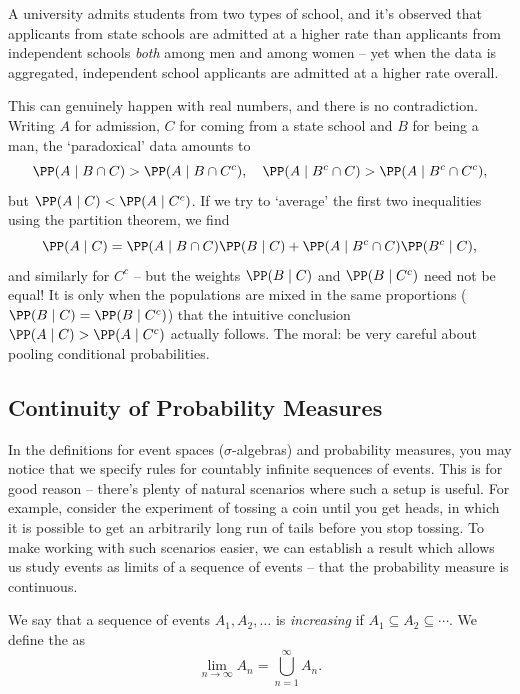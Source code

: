 \begin{example}
	A university admits students from two types of school, and it's observed that applicants from state schools are admitted at a higher rate than applicants from independent schools \emph{both} among men and among women -- yet when the data is aggregated, independent school applicants are admitted at a higher rate overall.

	This can genuinely happen with real numbers, and there is no contradiction. Writing $A$ for admission, $C$ for coming from a state school and $B$ for being a man, the `paradoxical' data amounts to
	$$
	\PP(A \mid B \cap C) > \PP(A \mid B \cap C^c), \quad \PP(A \mid B^c \cap C) > \PP(A \mid B^c \cap C^c),
	$$
	but $\PP(A \mid C) < \PP(A \mid C^c)$. If we try to `average' the first two inequalities using the partition theorem, we find
	$$
	\PP(A \mid C) = \PP(A \mid B \cap C)\PP(B \mid C) + \PP(A \mid B^c \cap C) \PP(B^c \mid C),
	$$
	and similarly for $C^c$ -- but the weights $\PP(B \mid C)$ and $\PP(B \mid C^c)$ need not be equal! It is only when the populations are mixed in the same proportions ($\PP(B \mid C) = \PP(B \mid C^c)$) that the intuitive conclusion $\PP(A \mid C) > \PP(A \mid C^c)$ actually follows. The moral: be very careful about pooling conditional probabilities.
\end{example}

\subsection{Continuity of Probability Measures}

In the definitions for event spaces ($\sigma$-algebras) and probability measures, you may notice that we specify rules for countably infinite sequences of events. This is for good reason -- there's plenty of natural scenarios where such a setup is useful. For example, consider the experiment of tossing a coin until you get heads, in which it is possible to get an arbitrarily long run of tails before you stop tossing. To make working with such scenarios easier, we can establish a result which allows us study events as limits of a sequence of events -- that the probability measure is continuous.


\begin{definition}
	We say that a sequence of events $A_1, A_2, \dots$ is \emph{increasing} if $A_1 \subseteq A_2 \subseteq \cdots$. We define the  as
	$$
	\lim_{n \to \infty} A_n = \bigcup_{n = 1}^{\infty} A_n.
	$$
\end{definition}

